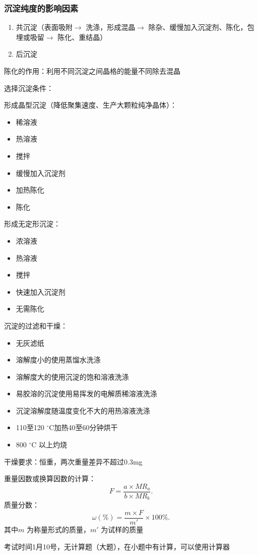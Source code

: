 \subsubsection*{沉淀纯度的影响因素}%
\label{subsub:沉淀纯度的影响因素}
\begin{enumerate}
    \item 共沉淀（表面吸附$\to $ 洗涤，形成混晶$\to $ 除杂、缓慢加入沉淀剂、陈化，包埋或吸留$\to $ 陈化、重结晶）
    \item 后沉淀
\end{enumerate}
\begin{notation}
陈化的作用：利用不同沉淀之间晶格的能量不同除去混晶
\end{notation}
\begin{notation}
    选择沉淀条件：

    形成晶型沉淀（降低聚集速度、生产大颗粒纯净晶体）：
    \begin{itemize}
        \item 稀溶液
        \item 热溶液
        \item 搅拌
        \item 缓慢加入沉淀剂
        \item 加热陈化
        \item 陈化
    \end{itemize}
    形成无定形沉淀：
    \begin{itemize}
        \item 浓溶液
        \item 热溶液
        \item 搅拌
        \item 快速加入沉淀剂
        \item 无需陈化
    \end{itemize}
\end{notation}
\begin{notation}
沉淀的过滤和干燥：
\begin{itemize}
    \item 无灰滤纸
    \item 溶解度小的使用蒸馏水洗涤
    \item 溶解度大的使用沉淀的饱和溶液洗涤
    \item 易胶溶的沉淀使用易挥发的电解质稀溶液洗涤
    \item 沉淀溶解度随温度变化不大的用热溶液洗涤
    \item 110至120 $^\circ\text{C}$加热40至60分钟烘干
    \item 800 $^\circ\text{C}$ 以上灼烧
\end{itemize}
干燥要求：恒重，两次重量差异不超过0.3mg
\end{notation}
\begin{notation}
    重量因数或换算因数的计算：
    \[
        F=\frac{a\times MR_{a}}{b\times MR_{b}}
    .\]
    质量分数：\[
        \omega\left( \% \right) = \frac{m\times F}{m'}\times 100\%
    .\]
    其中$m$ 为称量形式的质量，$m'$ 为试样的质量
\end{notation}
{}
考试时间1月10号，无计算题（大题），在小题中有计算，可以使用计算器
